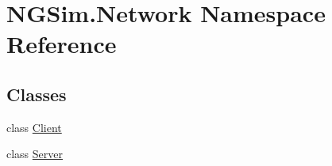 \hypertarget{namespace_n_g_sim_1_1_network}{}\section{N\+G\+Sim.\+Network Namespace Reference}
\label{namespace_n_g_sim_1_1_network}
\subsection*{Classes}
\begin{DoxyCompactItemize}
\item 
class \hyperlink{class_n_g_sim_1_1_network_1_1_client}{Client}
\item 
class \hyperlink{class_n_g_sim_1_1_network_1_1_server}{Server}
\end{DoxyCompactItemize}
